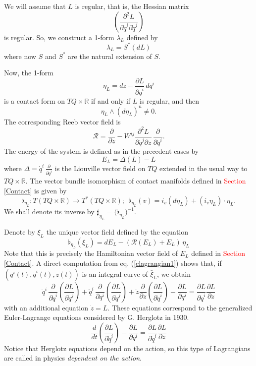 \documentclass[12pt]{article}
\begin{document}
We will assume that $L$ is regular, that is, the Hessian matrix
$$
\left( \frac{\partial^2 L}{\partial \dot{q}^i \partial \dot{q}^j} \right)
$$
is regular. So, we construct a 1-form $\lambda_L$ defined by
$$
\lambda_L = S^* (dL)
$$
where now $S$ and $S^*$ are the natural extension of $S$.

Now, the 1-form
$$
\eta_L = dz -  \frac{\partial L}{\partial \dot{q}^i} \, dq^i
$$
is a contact form on $TQ \times \mathbb R$ if and only if $L$ is regular, and then
$$
\eta_L \wedge (d\eta_L)^n \not= 0.
$$ 
The corresponding Reeb vector field is
$$
{\mathcal R} = \frac{\partial}{\partial z} - W^{ij} \frac{\partial^2 L}{\partial \dot{q}^j \partial z} \, \frac{\partial}{\partial \dot{q}^i}.
$$
The energy of the system is defined as in the precedent cases by 
$$
E_L = \Delta (L) - L
$$
where $\Delta = \dot{q}^i \, \frac{\partial}{\partial \dot{q}^i}$ is the Liouville vector field on $TQ$ extended in the usual way to $TQ \times \mathbb R$. The vector bundle isomorphism of contact manifolds defined in \textcolor{red}{Section \ref{Contact}} is given by
$$
{\flat_{\eta_L}} : T(TQ \times \mathbb R) \longrightarrow T^* (TQ \times \mathbb R);\,\,\,
{\flat_{\eta_L}} (v) = i_v (d\eta_L) + (i_v \eta_L) \cdot \eta_L.
$$
We shall denote its inverse by ${\sharp_{\eta_L}} = ({\flat_{\eta_L})}^{-1}$.

Denote by ${\xi}_L$ the unique vector field defined by the equation
\begin{equation}\label{clagrangian1}
{\flat_{\eta_L}} ({\xi}_L) = dE_L - (\mathcal R(E_L) + E_L) \, \eta_L
\end{equation}
Note that this is precisely the Hamiltonian vector field of $E_L$ defined in \textcolor{red}{Section \ref{Contact}}.
A direct computation from eq. (\ref{clagrangian1}) shows that,
if $(q^i(t), \dot{q}^i(t), z(t))$ is an integral curve of $\bar{\xi}_L$, we obtain
$$
{\ddot{q}}^i \, \frac{\partial}{\partial \dot{q}^i}\left(\frac{\partial L}{\partial \dot{q}^j}\right) 
+ \dot{q}^i \, \frac{\partial}{\partial q^i}\left(\frac{\partial L}{\partial \dot{q}^j}\right) 
+  \dot{z} \frac{\partial}{\partial z}\left(\frac{\partial L}{\partial \dot{q}^i}\right) - \frac{\partial L}{\partial q^i} =
\frac{\partial L}{\partial \dot{q}^i} \frac{\partial L}{\partial z}
$$
with an additional equation $\dot{z} = L$. These equations
correspond to the generalized Euler-Lagrange equations considered by G. Herglotz in 1930.
\begin{equation}\label{clagrangian4}
\frac{d}{dt} \left(\frac{\partial L}{\partial \dot{q}^i}\right) - \frac{\partial L}{\partial q^i} =
\frac{\partial L}{\partial \dot{q}^i} \frac{\partial L}{\partial z}
\end{equation}
Notice that Herglotz equations depend on the action, so this type of Lagrangians are called in physics \textit{dependent on the action}.
\end{document}
